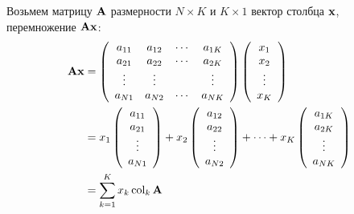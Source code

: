 \begin{frame}
    \vspace{2em}
    Возьмем матрицу $\mathbf A$ размерности $N \times K$ и $K \times 1$ вектор
    столбца ${\mathbf x}$, перемножение $\mathbf A {\mathbf x}$:
    \begin{align*}
        \mathbf A {\mathbf x}
        & = 
        \left(
        \begin{array}{cccc}
            a_{11} & a_{12} & \cdots & a_{1K} \\
            a_{21} & a_{22} & \cdots & a_{2K} \\
            \vdots & \vdots &  & \vdots \\
            a_{N1} & a_{N2} & \cdots & a_{NK} 
        \end{array}
        \right)
        \left(
        \begin{array}{c}
            x_1 \\
            x_2 \\
            \vdots \\
            x_K
        \end{array}
        \right)
        \\
        & =
        x_1 \left(
        \begin{array}{c}
            a_{11} \\
            a_{21} \\
            \vdots \\
            a_{N1} 
        \end{array}
        \right)
        +
        x_2 \left(
        \begin{array}{c}
            a_{12} \\
            a_{22} \\
            \vdots \\
            a_{N2} 
        \end{array}
        \right)
        + \cdots + 
        x_K \left(
        \begin{array}{c}
            a_{1K} \\
            a_{2K} \\
            \vdots \\
            a_{NK} 
        \end{array}
        \right)
        \\
        & = 
        \sum_{k=1}^K x_k \operatorname{col}_k \mathbf A
    \end{align*}
%
\end{frame}

